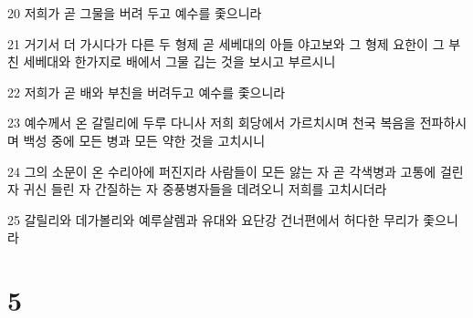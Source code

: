 \par 20 저희가 곧 그물을 버려 두고 예수를 좇으니라
\par 21 거기서 더 가시다가 다른 두 형제 곧 세베대의 아들 야고보와 그 형제 요한이 그 부친 세베대와 한가지로 배에서 그물 깁는 것을 보시고 부르시니
\par 22 저희가 곧 배와 부친을 버려두고 예수를 좇으니라
\par 23 예수께서 온 갈릴리에 두루 다니사 저희 회당에서 가르치시며 천국 복음을 전파하시며 백성 중에 모든 병과 모든 약한 것을 고치시니
\par 24 그의 소문이 온 수리아에 퍼진지라 사람들이 모든 앓는 자 곧 각색병과 고통에 걸린 자 귀신 들린 자 간질하는 자 중풍병자들을 데려오니 저희를 고치시더라
\par 25 갈릴리와 데가볼리와 예루살렘과 유대와 요단강 건너편에서 허다한 무리가 좇으니라

\chapter{5}

